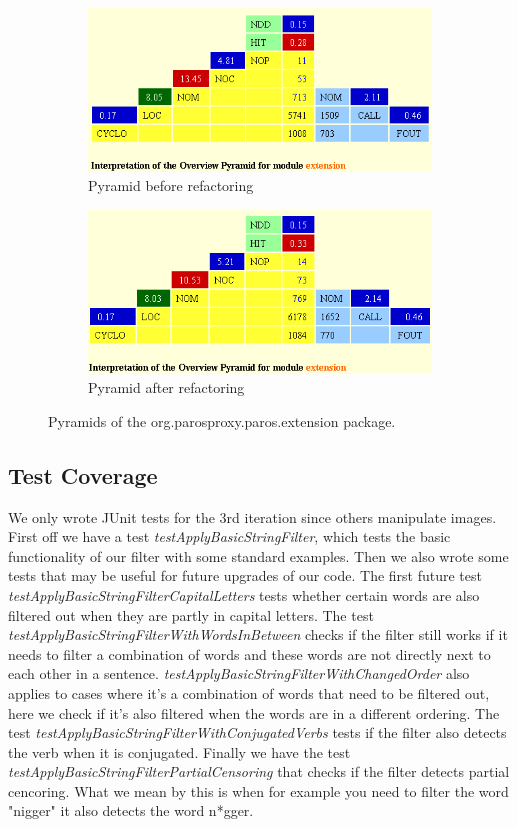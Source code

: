 \begin{figure}[h]
	\begin{subfigure}{0.5\textwidth}
		\centering
		\includegraphics[width=0.9\linewidth]{../Diagrams/pyramidExtensionPreRef}
		\caption{Pyramid before refactoring}
	\end{subfigure}%
	\begin{subfigure}{0.5\textwidth}
		\centering
		\includegraphics[width=0.9\linewidth]{../Diagrams/pyramidExtensionProstRef}
		\caption{Pyramid after refactoring}
	\end{subfigure}
	\caption{Pyramids of the org.parosproxy.paros.extension package.}
\end{figure}



\subsection{Test Coverage}
We only wrote JUnit tests for the 3rd iteration since others manipulate images.
First off we have a test \textit{testApplyBasicStringFilter}, which tests the basic functionality of our filter with some standard examples. 
Then we also wrote some tests that may be useful for future upgrades of our code.
The first future test \textit{testApplyBasicStringFilterCapitalLetters} tests whether certain words 
are also filtered out when they are partly in capital letters. 
The test \textit{testApplyBasicStringFilterWithWordsInBetween} checks if the filter still works if 
it needs to filter a combination of words and these words are not directly next to each other in a sentence.
\textit{testApplyBasicStringFilterWithChangedOrder} also applies to cases where it's a combination of
words that need to be filtered out, here we check if it's also filtered when the words are in a different 
ordering.
The test \textit{testApplyBasicStringFilterWithConjugatedVerbs} tests if the filter also detects the 
verb when it is conjugated.
Finally we have the test \textit{testApplyBasicStringFilterPartialCensoring} that checks if the filter detects 
partial cencoring. What we mean by this is when for example you need to filter the word "nigger" it also
detects the word n*gger.
